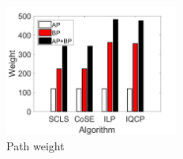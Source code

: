 \begin{figure}[tp]
\centering
\begin{minipage}[t]{0.5\linewidth}
\centering
\includegraphics[width=2.25in]{franz/weight}
\caption{Path weight}
\label{fig:normalization weitgh sum}
\end{minipage}

\end{figure}


